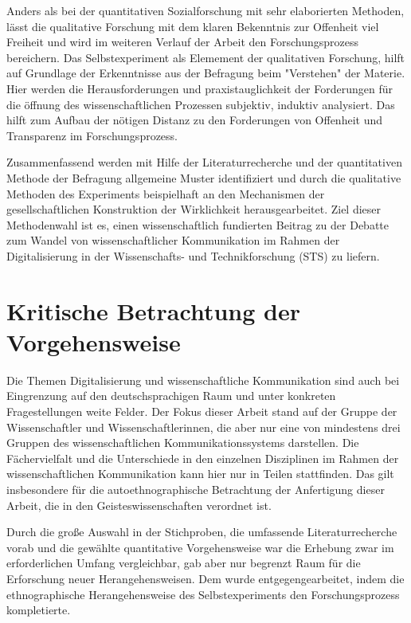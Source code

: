 {Anders als bei der quantitativen Sozialforschung mit sehr elaborierten Methoden,
lässt die qualitative Forschung mit dem klaren Bekenntnis zur Offenheit viel Freiheit und wird im weiteren Verlauf der Arbeit den Forschungsprozess bereichern. Das Selbstexperiment als Elemement der qualitativen Forschung, hilft auf Grundlage der Erkenntnisse aus der Befragung beim "Verstehen" der Materie. Hier werden die Herausforderungen und praxistauglichkeit der Forderungen für die öffnung des wissenschaftlichen Prozessen subjektiv, induktiv analysiert. Das hilft zum Aufbau der nötigen Distanz zu den Forderungen von Offenheit und Transparenz im Forschungsprozess.

Zusammenfassend werden mit Hilfe der Literaturrecherche und der quantitativen Methode der Befragung allgemeine Muster identifiziert und durch die qualitative Methoden des Experiments beispielhaft an den Mechanismen der gesellschaftlichen Konstruktion der Wirklichkeit herausgearbeitet. Ziel dieser Methodenwahl ist es, einen wissenschaftlich fundierten Beitrag zu der Debatte zum Wandel von wissenschaftlicher Kommunikation im Rahmen der Digitalisierung in der Wissenschafts- und Technikforschung (STS) zu liefern.

\section{Kritische Betrachtung der Vorgehensweise}

Die Themen Digitalisierung und wissenschaftliche Kommunikation sind auch bei Eingrenzung auf den deutschsprachigen Raum und unter konkreten Fragestellungen weite Felder. Der Fokus dieser Arbeit stand auf der Gruppe der Wissenschaftler und Wissenschaftlerinnen, die aber nur eine von mindestens drei Gruppen des wissenschaftlichen Kommunikationssystems darstellen. Die Fächervielfalt und die Unterschiede in den einzelnen Disziplinen im Rahmen der wissenschaftlichen Kommunikation kann hier nur in Teilen stattfinden. Das gilt insbesondere für die autoethnographische Betrachtung der Anfertigung dieser Arbeit, die in den Geisteswissenschaften verordnet ist.

Durch die große Auswahl in der Stichproben, die umfassende Literaturrecherche vorab und die gewählte quantitative Vorgehensweise war die Erhebung zwar im erforderlichen Umfang vergleichbar, gab aber nur begrenzt Raum für die Erforschung neuer Herangehensweisen. Dem wurde entgegengearbeitet, indem die ethnographische Herangehensweise des Selbstexperiments den Forschungsprozess kompletierte.

}
